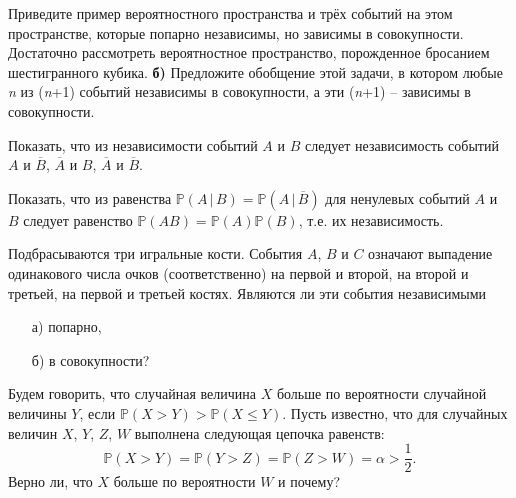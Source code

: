 
\begin{problem}
Приведите пример вероятностного пространства и трёх событий на этом пространстве, которые попарно независимы, но зависимы в совокупности. Достаточно рассмотреть вероятностное пространство, порожденное бросанием шестигранного кубика. \textbf{б) }Предложите обобщение этой задачи, в котором любые \textit{n} из (\textit{n}+1) событий независимы в совокупности, а эти (\textit{n}+1) -- зависимы в совокупности.
\end{problem}



\begin{problem}
Показать, что из независимости событий $A$ и $B$ следует независимость событий $A$ и $\overline B$, $\overline A$ и $B$, 
$\overline A$ и $\overline B$. 
\end{problem}


\begin{problem}
Показать, что из равенства ${\mathbb P}(A\, |\, B)={\mathbb P}(A\, |\, \overline B)$ для ненулевых событий $A$ и $B$ следует 
равенство ${\mathbb P}(AB)={\mathbb P}(A){\mathbb P}(B)$, т.е. их независимость. 
\end{problem}


\begin{problem}
Подбрасываются три игральные кости. События $A$, $B$ и $C$ означают выпадение одинакового числа очков (соответственно) на первой и 
второй, на второй и третьей, на первой и третьей костях. Являются ли эти события независимыми 
\begin{enumerate}
\item[а)] попарно, 
\item[б)] в совокупности? 
\end{enumerate}
\end{problem}


\begin{problem}
Будем говорить, что случайная величина $X$ больше по вероятности случайной величины $Y$, если ${\mathbb P}(X>Y)>{\mathbb P}(X\le Y)$. 
Пусть известно, что для случайных величин $X$, $Y$, $Z$, $W$ выполнена следующая цепочка равенств: 
$$
{\mathbb P}(X>Y)={\mathbb P}(Y>Z)={\mathbb P}(Z>W)=\alpha>\frac{1}{2} . 
$$
Верно ли, что $X$ больше по вероятности $W$ и почему? 
\end{problem}



